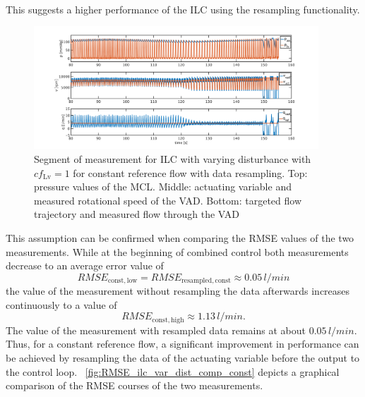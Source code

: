 \\This suggests a higher performance of the ILC using the resampling functionality.
\begin{figure}[ht!]
  \centering
  \includegraphics[width=0.95\textwidth]{images/chapt_5/ILC/ilc_var_dist_fix_const.pdf}
  \caption[Segment of measurement for ILC with varying disturbance with $cf_{\mathrm{Lv}}=1$ for constant reference flow with data resampling]{Segment of measurement for ILC with varying disturbance with $cf_{\mathrm{Lv}}=1$ for constant reference flow with data resampling. Top:  pressure values of the MCL. Middle: actuating variable and measured rotational speed of the VAD. Bottom: targeted flow trajectory and measured flow through the VAD}
  \label{fig:ilc_var_dist_fix_const}
\end{figure}
This assumption can be confirmed when comparing the RMSE values of the two measurements.
While at the beginning of combined control both measurements decrease to an average error value of
\begin{equation}
  RMSE_{\mathrm{const,low}}=RMSE_{\mathrm{resampled,const}}\approx0.05\,l/min
\end{equation}
 the value of the measurement without resampling the data afterwards increases continuously to a value of
\begin{equation}
  RMSE_{\mathrm{const,high}}\approx1.13\,l/min.
\end{equation}
The value of the measurement with resampled data remains at about $0.05\,l/min$. Thus, for a constant reference flow, a significant improvement in performance can be achieved by resampling the data of the actuating variable before the output to the control loop.
\figurename~\ref{fig:RMSE_ilc_var_dist_comp_const} depicts a graphical comparison of the RMSE courses of the two measurements.
